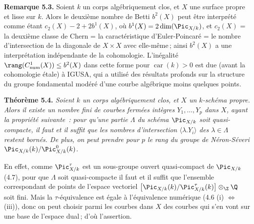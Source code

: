 \textbf{Remarque 5.3.} Soient \(k\) un corps alg\'ebriquement clos, et \(X\) une surface propre et lisse sur \(k\). Alors le deuxi\`eme nombre de Betti \(b^2(X)\) peut \^etre interpr\'et\'e comme \'etant \(c_2(X)-2+2b^1(X)\), o\`u \(b^1(X)=2\dim(\Pic_{X/k})\), et \(c_2(X)\) = la deuxi\`eme classe de Chern = la caract\'eristique d'Euler-Poincar\'e = le nombre d'intersection de la diagonale de \(X\times X\) avec elle-m\^eme\,; ainsi \(b^2(X)\) a une interpr\'etation ind\'ependante de la cohomologie. L'in\'egalit\'e \(\rang(C^1_{\rm num}(X))\le b^2(X)\) dans cette forme pour \(\operatorname{car}(k)>0\) est due (avant la cohomologie \'etale) \`a IGUSA, qui a utilis\'e des r\'esultats profonds sur la structure du groupe fondamental mod\'er\'e d'une courbe alg\'ebrique moins quelques points.

\textbf{Th\'eor\`eme 5.4.} \emph{Soient \(k\) un corps alg\'ebriquement clos, et \(X\) un \(k\)-sch\'ema propre. Alors il existe un nombre fini de courbes ferm\'ees int\`egres \(Y_1,\ldots,Y_p\) dans \(X\), ayant la propri\'et\'e suivante~: pour qu'une partie \(\Lambda\) du sch\'ema \(\Pic_{X/k}\) soit quasi-compacte, il faut et il suffit que les nombres d'intersection \(\langle\lambda.Y_i\rangle\) des \(\lambda\in\Lambda\) restent born\'es. De plus, on peut prendre pour \(p\) le rang du groupe de N\'eron-S\'everi \(\Pic_{X/k}(k)/\Pic^0_{X/k}(k)\).}

En effet, comme \(\Pic^\tau_{X/k}\) est un sous-groupe ouvert quasi-compact de \(\Pic_{X/k}\) (4.7), pour que \(\Lambda\) soit quasi-compacte il faut et il suffit que l'ensemble correspondant de points de l'espace vectoriel \(\bigl[\Pic_{X/k}(k)/\Pic^\tau_{X/k}(k)\bigr]\otimes_{\Z}\Q\) soit fini. Mais la \(\tau\)-\'equivalence est \'egale \`a l'\'equivalence num\'erique (4.6 (i) \(\Longleftrightarrow\) (iii)), donc on peut choisir parmi les courbes dans \(X\) des courbes qui s'en vont sur une base de l'espace dual\,; d'o\`u l'assertion.


